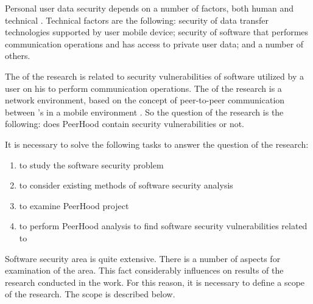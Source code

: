 %
Personal user data security depends on a number of factors, both human and technical . 
%
Technical factors are the following: security of data transfer technologies supported by user mobile device; security of software that performes communication operations and has access to private user data; and a number of others. 

%
The  of the research is related to security vulnerabilities of software utilized by a user on his  to perform communication operations. 
%
The  of the research is a network environment, based on the concept of peer-to-peer communication between 's in a mobile environment . 
%
So the question of the research is the following: does PeerHood contain security vulnerabilities or not. 

%
It is necessary to solve the following tasks to answer the question of the research: 
\begin{enumerate}
	\item to study the software security problem
	\item to consider existing methods of software security analysis
	\item to examine PeerHood project
	\item to perform PeerHood analysis to find software security vulnerabilities related to 
\end{enumerate}

%
Software security area is quite extensive. 
%
There is a number of aspects for examination of the area. 
%
This fact considerably influences on \The results of the research conducted in the work. 
%
For this reason, it is necessary to define a scope of the research. 
%
The scope is described below. 

